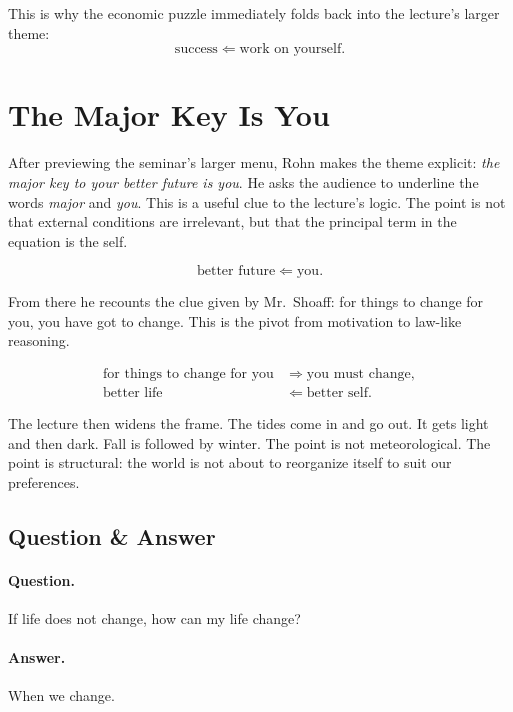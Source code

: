 This is why the economic puzzle immediately folds back into the lecture's larger theme:
\begin{equation}
\text{success} \Leftarrow \text{work on yourself}.
\end{equation}

\section{The Major Key Is You}

After previewing the seminar's larger menu, Rohn makes the theme explicit: \emph{the major key to your better future is you}. He asks the audience to underline the words \emph{major} and \emph{you}. This is a useful clue to the lecture's logic. The point is not that external conditions are irrelevant, but that the principal term in the equation is the self.

\begin{equation}
\text{better future} \Leftarrow \text{you}.
\end{equation}

From there he recounts the clue given by Mr.\ Shoaff: for things to change for you, you have got to change. This is the pivot from motivation to law-like reasoning.

\begin{align}
\text{for things to change for you} &\Rightarrow \text{you must change},\\
\text{better life} &\Leftarrow \text{better self}.
\end{align}

The lecture then widens the frame. The tides come in and go out. It gets light and then dark. Fall is followed by winter. The point is not meteorological. The point is structural: the world is not about to reorganize itself to suit our preferences.

\subsection{Question \& Answer}

\paragraph{Question.} If life does not change, how can my life change?

\paragraph{Answer.} When we change.

